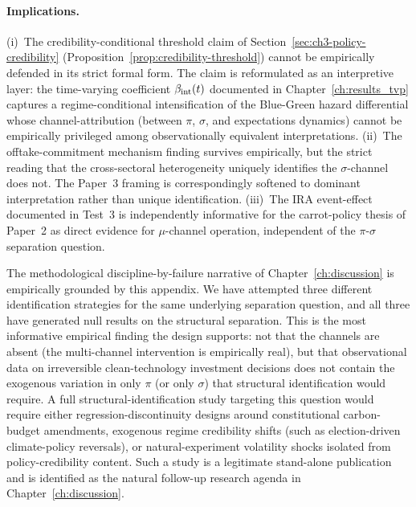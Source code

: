 \paragraph{Implications.} (i)~The credibility-conditional threshold claim of Section~\ref{sec:ch3-policy-credibility} (Proposition~\ref{prop:credibility-threshold}) cannot be empirically defended in its strict formal form. The claim is reformulated as an interpretive layer: the time-varying coefficient $\beta_{\mathrm{int}}(t)$ documented in Chapter~\ref{ch:results_tvp} captures a regime-conditional intensification of the Blue-Green hazard differential whose channel-attribution (between $\pi$, $\sigma$, and expectations dynamics) cannot be empirically privileged among observationally equivalent interpretations. (ii)~The offtake-commitment mechanism finding survives empirically, but the strict reading that the cross-sectoral heterogeneity uniquely identifies the $\sigma$-channel does not. The Paper~3 framing is correspondingly softened to dominant interpretation rather than unique identification. (iii)~The IRA event-effect documented in Test~3 is independently informative for the carrot-policy thesis of Paper~2 as direct evidence for $\mu$-channel operation, independent of the $\pi$-$\sigma$ separation question.

The methodological discipline-by-failure narrative of Chapter~\ref{ch:discussion} is empirically grounded by this appendix. We have attempted three different identification strategies for the same underlying separation question, and all three have generated null results on the structural separation. This is the most informative empirical finding the design supports: not that the channels are absent (the multi-channel intervention is empirically real), but that observational data on irreversible clean-technology investment decisions does not contain the exogenous variation in only $\pi$ (or only $\sigma$) that structural identification would require. A full structural-identification study targeting this question would require either regression-discontinuity designs around constitutional carbon-budget amendments, exogenous regime credibility shifts (such as election-driven climate-policy reversals), or natural-experiment volatility shocks isolated from policy-credibility content. Such a study is a legitimate stand-alone publication and is identified as the natural follow-up research agenda in Chapter~\ref{ch:discussion}.
